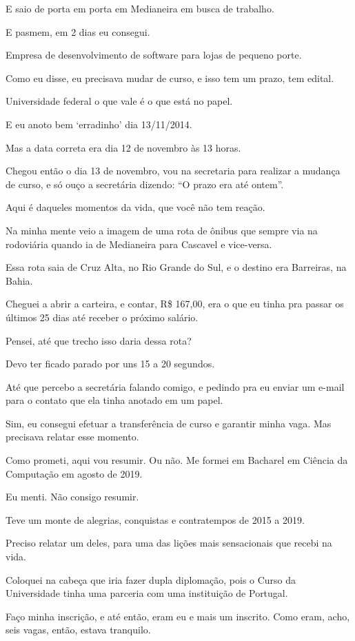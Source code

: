E saio de porta em porta em Medianeira em busca de trabalho. 

E pasmem, em 2 dias eu consegui. 

Empresa de desenvolvimento de software para lojas de pequeno porte.

Como eu disse, eu precisava mudar de curso, e isso tem um prazo, tem edital. 

Universidade federal o que vale é o que está no papel. 

E eu anoto bem ‘erradinho’ dia 13/11/2014. 

Mas a data correta era dia 12 de novembro às 13 horas. 

Chegou então o dia 13 de novembro, vou na secretaria para realizar a mudança de curso, e só ouço a secretária dizendo: “O prazo era até ontem”.

Aqui é daqueles momentos da vida, que você não tem reação. 

Na minha mente veio a imagem de uma rota de ônibus que sempre via na rodoviária quando ia de Medianeira para Cascavel e vice-versa.
 
Essa rota saia de Cruz Alta, no Rio Grande do Sul, e o destino era Barreiras, na Bahia. 

Cheguei a abrir a carteira, e contar, R\$ 167,00, era o que eu tinha pra passar os últimos 25 dias até receber o próximo salário. 

Pensei, até que trecho isso daria dessa rota? 

Devo ter ficado parado por uns 15 a 20 segundos. 

Até que percebo a secretária falando comigo, e pedindo pra eu enviar um e-mail para o contato que ela tinha anotado em um papel. 

Sim, eu consegui efetuar a transferência de curso e garantir minha vaga. Mas precisava relatar esse momento.

Como prometi, aqui vou resumir. Ou não. Me formei em Bacharel em Ciência da Computação em agosto de 2019. 

Eu menti. Não consigo resumir.  

Teve um monte de alegrias, conquistas e contratempos de 2015 a 2019.

Preciso relatar um deles, para uma das lições mais sensacionais que recebi na vida.

Coloquei na cabeça que iria fazer dupla diplomação, pois o Curso da Universidade tinha uma parceria com uma instituição de Portugal.

Faço minha inscrição, e até então, eram eu e mais um inscrito. Como eram, acho, seis vagas, então, estava tranquilo. 

